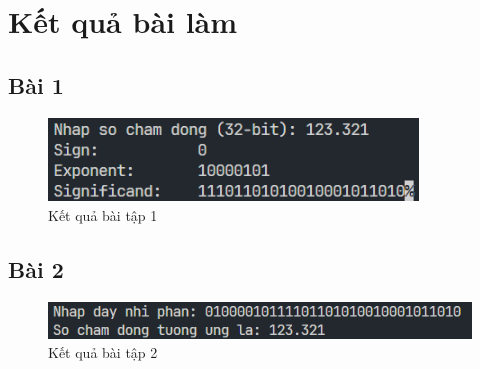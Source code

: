 \documentclass[a4paper,12pt]{report}
\begin{document}
\pagebreak
\section{Kết quả bài làm}
\subsection{Bài 1}
\begin{figure}[!ht]
	\centering
	\includegraphics[width=0.875\textwidth]{imgs/1.png}
	\caption{Kết quả bài tập 1}
\end{figure}

\subsection{Bài 2}
\begin{figure}[!ht]
	\centering
	\includegraphics[width=0.875\linewidth]{imgs/2.png}
	\caption{Kết quả bài tập 2}
\end{figure}
\end{document}
